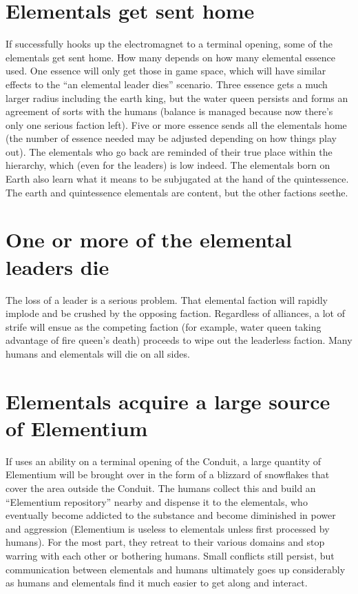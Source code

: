 \documentclass[green]{elementals}
\begin{document}
\name{\gEndGame{}}


\section{Elementals get sent home}

If \cGD{\intro} successfully hooks up the electromagnet to a terminal opening, some of the elementals get sent home. How many depends on how many elemental essence \cGD{} used. One essence will only get those in game space, which will have similar effects to the ``an elemental leader dies'' scenario. Three essence gets a much larger radius including the earth king, but the water queen persists and forms an agreement of sorts with the humans (balance is managed because now there's only one serious faction left). Five or more essence sends all the elementals home (the number of essence needed may be adjusted depending on how things play out). The elementals who go back are reminded of their true place within the hierarchy, which (even for the leaders) is low indeed. The elementals born on Earth also learn what it means to be subjugated at the hand of the quintessence. The earth and quintessence elementals are content, but the other factions seethe.

\section{One or more of the elemental leaders die}

The loss of a leader is a serious problem. That elemental faction will rapidly implode and be crushed by the opposing faction. Regardless of alliances, a lot of strife will ensue as the competing faction (for example, water queen taking advantage of fire queen's death) proceeds to wipe out the leaderless faction. Many humans and elementals will die on all sides.

\section{Elementals acquire a large source of Elementium}

If \cScientist{\intro} uses an ability on a terminal opening of the Conduit, a large quantity of Elementium will be brought over in the form of a blizzard of snowflakes that cover the area outside the Conduit. The humans collect this and build an ``Elementium repository'' nearby and dispense it to the elementals, who eventually become addicted to the substance and become diminished in power and aggression (Elementium is useless to elementals unless first processed by humans). For the most part, they retreat to their various domains and stop warring with each other or bothering humans. Small conflicts still persist, but communication between elementals and humans ultimately goes up considerably as humans and elementals find it much easier to get along and interact.
\end{document}
